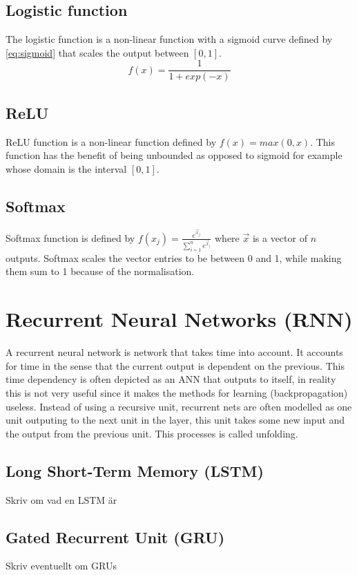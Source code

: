 \subsection{Logistic function}
The logistic function is a non-linear function with a sigmoid curve defined by \ref{eq:sigmoid} that scales the output between $[0, 1]$. 
\begin{equation}\label{eq:sigmoid}
    f(x)=\frac{1}{1+exp(-x)}
\end{equation}
\subsection{ReLU}
ReLU function is a non-linear function defined by $f(x) = max(0,x)$. This function has the benefit of being unbounded as opposed to sigmoid for example whose domain is the interval $[0, 1]$.  
\subsection{Softmax}
Softmax function is defined by $f(x_j) = \frac{e^{\vec{x}_j}}{\sum_{i=1}^{n} e^{\vec{x}_i}} $ where $\vec{x}$ is a vector of $n$ outputs. Softmax scales the vector entries to be between 0 and 1, while making them sum to 1 because of the normalisation.

\section{Recurrent Neural Networks (RNN)}
A recurrent neural network is network that takes time into account. It accounts for time in the sense that the current output is dependent on the previous. This time dependency is often depicted as an ANN that outputs to itself, in reality this is not very useful since it makes the methods for learning (backpropagation) useless. Instead of using a recursive unit, recurrent nets are often modelled as one unit outputing to the next unit in the layer, this unit takes some new input and the output from the previous unit. This processes is called unfolding.%
\subsection{Long Short-Term Memory (LSTM)}
Skriv om vad en LSTM är

\subsection{Gated Recurrent Unit (GRU)}
Skriv eventuellt om GRUs
